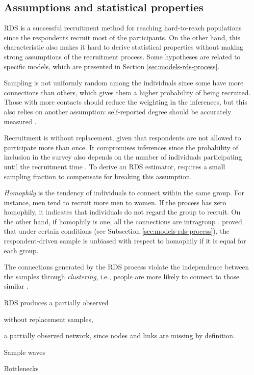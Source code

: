 \subsection{Assumptions and statistical properties}

RDS is a successful recruitment method for reaching hard-to-reach populations
since the respondents recruit most of the participants. On the other hand,
this characteristic also makes it hard to derive statistical properties
without making strong assumptions of the recruitment process.  Some hypotheses
are related to specific models, which are presented in Section
\ref{sec:models-rds-process}.   

\begin{alineas}
  \item Sampling is not uniformly random among the individuals since some have more
  connections than others, which gives them a higher probability of being
  recruited. Those with more contacts should reduce the weighting in the
  inferences, but this also relies on another assumption: self-reported degree
  should be accurately measured \cite[p. 297]{gile2010respondent}. 
  
  \item Recruitment is without replacement, given that respondents are not
  allowed to participate more than once. It compromises inferences since the
  probability of inclusion in the survey also depends on the number of
  individuals participating until the recruitment time \cite[p.
  299]{gile2010respondent}. To derive an RDS estimator, 
  \textcite[p. 81]{volz2008probability} requires a small sampling fraction to
  compensate for breaking this assumption.   

  \item {\em Homophily} is the tendency of individuals to connect within the same
  group. For instance, men tend to recruit more men to women. If the process
  has zero homophily, it indicates that individuals do not regard the group to
  recruit. On the other hand, if homophily is one, all the connections are
  intragroup \cite[p. 20]{heckathorn2002}. \textcite[p. 21]{heckathorn2002} proved
  that under certain conditions (see Subsection \ref{sec:models-rds-process}),
  the respondent-driven sample is unbiased with respect to homophily if it is
  equal for each group. 

  \item The connections generated by the RDS process violate the independence 
  between the samples through {\em clustering}, i.e., people are more likely 
  to connect to those similar \cite[p. 14]{avery2021statistical}.
  
  \item RDS produces a partially observed 
  
  without replacement samples, 
  
  a partially observed network, since nodes and links are missing
  by definition. 

  \item Sample waves
  
  \item Bottlenecks

\end{alineas}

